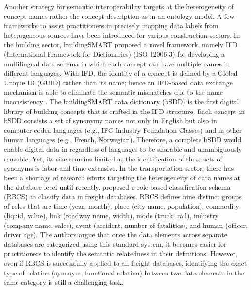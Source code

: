 \documentclass[Journal, BackFigs, DoubleSpace]{ascelike}%
\begin{document}
Another strategy for semantic interoperability targets at the heterogeneity of concept names rather the concept description as in an ontology model. A few frameworks to assist practitioners in precisely mapping data labels from heterogeneous sources have been introduced for various construction sectors. In the building sector, buildingSMART proposed a novel framework, namely IFD (International Framework for Dictionaries) (ISO 12006-3) for developing a multilingual data schema in which each concept can have multiple names in different languages. With IFD, the identity of a concept is defined by a Global Unique ID (GUID) rather than its name; hence an IFD-based data exchange mechanism is able to eliminate the semantic mismatches due to the name inconsistency \cite{IFDgroup08,hezik08}. The buildingSMART data dictionary (bSDD) \cite{buildingsmartData} is the first digital library of building concepts that is crafted in the IFD structure. Each concept in bSDD consists a set of synonymy names not only in English but also in computer-coded languages (e.g., IFC-Industry Foundation Classes) and in other human languages (e.g., French, Norwegian). Therefore, a complete bSDD would enable digital data in regardless of languages to be sharable and unambiguously reusable. Yet, its size remains limited as the identification of these sets of synonyms is labor and time extensive. In the transportation sector, there has been a shortage of research efforts targeting the heterogeneity of data names at the database level until recently.   proposed a role-based classification schema (RBCS) to classify data in freight databases. RBCS defines nine distinct groups of roles that are time (year, month), place (city name, population), commodity (liquid, value), link (roadway name, width), mode (truck, rail), industry (company name, sales), event (accident, number of fatalities), and human (officer, driver age). The authors argue that once the data elements across separate databases are categorized using this standard system, it becomes easier for practitioners to identify the semantic relatedness in their definitions. However, even if RBCS is successfully applied to all freight databases, identifying the exact type of relation (synonym, functional relation) between two data elements in the same category is still a challenging task.
\par
\end{document}
